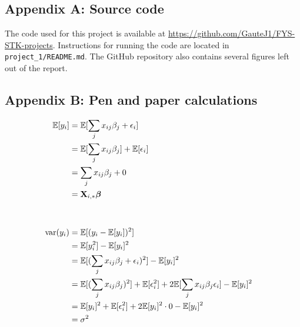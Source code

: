 \subsection{Appendix A: Source code} \label{appendixA}
The code used for this project is available at \url{https://github.com/GauteJ1/FYS-STK-projects}. Instructions for running the code are located in \texttt{ project\_1/README.md}. The GitHub repository also contains several figures left out of the report. 


\subsection{Appendix B: Pen and paper calculations}\label{appendixB}
\begin{align*}
    \mathbb{E}[y_i] & = \mathbb{E}[\sum_j x_{ij}\beta_j + \epsilon_i] \\
    & = \mathbb{E}[\sum_j x_{ij}\beta_j] + \mathbb{E}[\epsilon_i] \\ 
    & = \sum_j x_{ij}\beta_j + 0 \\
    & = \mathbf{X}_{i,*}\boldsymbol{\beta}
    &  \\
    &  \\
    &  \\
    \text{var}(y_i) & = \mathbb{E}[(y_i -\mathbb{E}[y_i])^2] \\
    & = \mathbb{E}[y_i^2] - \mathbb{E}[y_i]^2 \\ 
    & = \mathbb{E}[(\sum_j x_{ij}\beta_j + \epsilon_i)^2] - \mathbb{E}[y_i]^2 \\
    & = \mathbb{E}[(\sum_j x_{ij}\beta_j)^2] + \mathbb{E}[\epsilon_i^2] + 2\mathbb{E}[\sum_j x_{ij}\beta_j \epsilon_i ] - \mathbb{E}[y_i]^2 \\
    & = \mathbb{E}[y_i]^2 + \mathbb{E}[\epsilon_i^2] + 2\mathbb{E}[y_i]^2\cdot 0 - \mathbb{E}[y_i]^2 \\ 
    & = \sigma^2
\end{align*}

